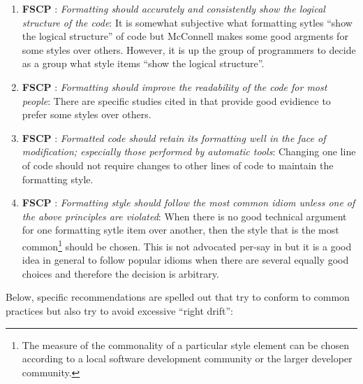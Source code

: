 \begin{enumerate}

{}\item{}\textbf{FSCP }:
{}\textit{Formatting should accurately and consistently show the logical
structure of the code}: It is somewhat subjective what formatting sytles
``show the logical structure'' of code but McConnell makes some good argments
for some styles over others.  However, it is up the group of programmers to
decide as a group what style items ``show the logical structure''.

{}\item{}\textbf{FSCP }:
{}\textit{Formatting should improve the readability of the code for most
people}: There are specific studies cited in {}\cite[Chapter
31]{CodeComplete2nd04} that provide good evidience to prefer some styles over
others.

{}\item{}\textbf{FSCP }:
{}\textit{Formatted code should retain its formatting well in the face of
modification; especially those performed by automatic tools}: Changing one
line of code should not require changes to other lines of code to maintain the
formatting style.

{}\item{}\textbf{FSCP }:
{}\textit{Formatting style should follow the most common idiom unless one
of the above principles are violated}: When there is no good technical
argument for one formatting sytle item over another, then the style that is
the most common\footnote{The measure of the commonality of a particular style
element can be chosen according to a local software development community or
the larger developer community.} should be chosen.  This is not advocated
per-say in {}\cite[Chapter 31]{CodeComplete2nd04} but it is a good idea in
general to follow popular idioms when there are several equally good choices
and therefore the decision is arbitrary.

\end{enumerate}

Below, specific recommendations are spelled out that try to conform to common
practices but also try to avoid excessive ``right drift'':

